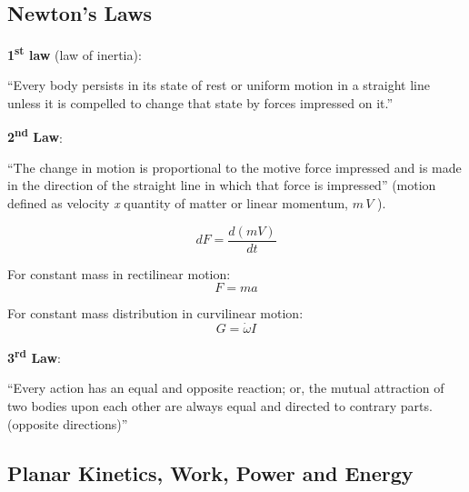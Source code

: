 \documentclass[
]{book}
\begin{document}
\hypertarget{newtons-laws}{%
\subsection{Newton's Laws}\label{newtons-laws}}

\textbf{1\textsuperscript{st} law} (law of inertia):

``Every body persists in its state of rest or uniform motion in a straight line unless it is compelled to change that state by forces impressed on it.''

\textbf{2\textsuperscript{nd} Law}:

``The change in motion is proportional to the motive force impressed and is made in the direction of the straight line in which that force is impressed'' (motion defined as velocity \emph{x} quantity of matter or linear momentum, \(m\,V\) ).

\[
dF = \frac{d(mV)}{dt}
\]

For constant mass in rectilinear motion: \[F = ma\]

For constant mass distribution in curvilinear motion: \[G = \dot{\omega} I\]

\textbf{3\textsuperscript{rd} Law}:

``Every action has an equal and opposite reaction; or, the mutual attraction of two bodies upon each other are always equal and directed to contrary parts.(opposite directions)''

\hypertarget{planar-kinetics-work-power-and-energy}{%
\subsection{Planar Kinetics, Work, Power and Energy}\label{planar-kinetics-work-power-and-energy}}
\end{document}
